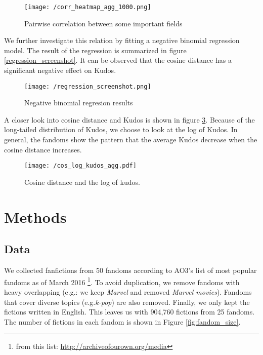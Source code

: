 \documentclass[a4paper]{article}
\begin{document}
\begin{figure}[htbp]
\begin{center}
\texttt{[image: /corr\_heatmap\_agg\_1000.png]}
\caption{Pairwise correlation between some important fields }
\label{fig:corr_heatmap}
\end{center}
\end{figure}

We further investigate this relation by fitting a negative binomial regression model. The result of the regression is summarized in figure \ref{regression_screenshot}. It can be observed that the cosine distance has a significant negative effect on Kudos.

\begin{figure}[htbp]
\begin{center}
\texttt{[image: /regression\_screenshot.png]}
\caption{Negative binomial regresion results}
\label{fig:regression}
\end{center}
\end{figure}

A closer look into cosine distance and Kudos is shown in figure \ref{fig:cos_kudos}. Because of the long-tailed distribution of Kudos, we choose to look at the log of Kudos. In general, the fandoms show the pattern that the average Kudos decrease when the cosine distance increases.


\begin{figure}[htbp]
\begin{center}
\texttt{[image: /cos\_log\_kudos\_agg.pdf]}
\caption{Cosine distance and the log of kudos.}
\label{fig:cos_kudos}
\end{center}
\end{figure}







\section{Methods} %
\label{sec:methods}


\subsection{Data}
We collected fanfictions from 50 fandoms according to AO3's list of most popular fandoms as of March 2016 \footnote{from this list: \url{http://archiveofourown.org/media}}. To avoid duplication, we remove fandoms with heavy overlapping (e.g.: we keep \emph{Marvel} and removed \emph{Marvel movies}). Fandoms that cover diverse topics (e.g.\emph{k-pop}) are also removed. Finally, we only kept the fictions written in English. This leaves us with 904,760 fictions from 25 fandoms. The number of fictions in each fandom is shown in Figure \ref{fig:fandom_size}.
\end{document}
